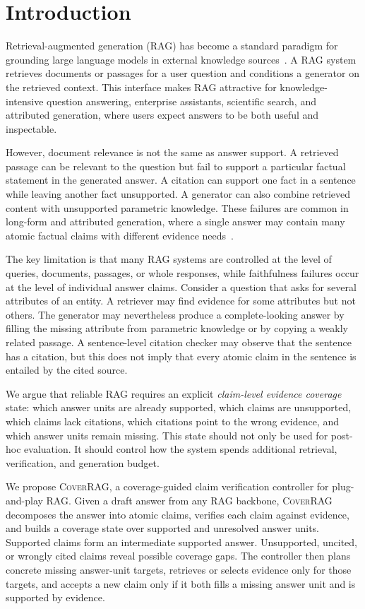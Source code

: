 \section{Introduction}
\label{sec:introduction}

Retrieval-augmented generation (RAG) has become a standard paradigm for grounding large language models in external knowledge sources~\cite{lewis2020retrieval,gao2023retrieval}. A RAG system retrieves documents or passages for a user question and conditions a generator on the retrieved context. This interface makes RAG attractive for knowledge-intensive question answering, enterprise assistants, scientific search, and attributed generation, where users expect answers to be both useful and inspectable.

However, document relevance is not the same as answer support. A retrieved passage can be relevant to the question but fail to support a particular factual statement in the generated answer. A citation can support one fact in a sentence while leaving another fact unsupported. A generator can also combine retrieved content with unsupported parametric knowledge. These failures are common in long-form and attributed generation, where a single answer may contain many atomic factual claims with different evidence needs~\cite{gao2023enabling,wallat2025correctness}.

The key limitation is that many RAG systems are controlled at the level of queries, documents, passages, or whole responses, while faithfulness failures occur at the level of individual answer claims. Consider a question that asks for several attributes of an entity. A retriever may find evidence for some attributes but not others. The generator may nevertheless produce a complete-looking answer by filling the missing attribute from parametric knowledge or by copying a weakly related passage. A sentence-level citation checker may observe that the sentence has a citation, but this does not imply that every atomic claim in the sentence is entailed by the cited source.

We argue that reliable RAG requires an explicit \emph{claim-level evidence coverage} state: which answer units are already supported, which claims are unsupported, which claims lack citations, which citations point to the wrong evidence, and which answer units remain missing. This state should not only be used for post-hoc evaluation. It should control how the system spends additional retrieval, verification, and generation budget.

We propose \textsc{CoverRAG}, a coverage-guided claim verification controller for plug-and-play RAG. Given a draft answer from any RAG backbone, \textsc{CoverRAG} decomposes the answer into atomic claims, verifies each claim against evidence, and builds a coverage state over supported and unresolved answer units. Supported claims form an intermediate supported answer. Unsupported, uncited, or wrongly cited claims reveal possible coverage gaps. The controller then plans concrete missing answer-unit targets, retrieves or selects evidence only for those targets, and accepts a new claim only if it both fills a missing answer unit and is supported by evidence.

